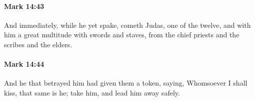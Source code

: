 		\paragraph{Mark 14:43} %
			\label{MARK-14-43}

			And immediately, while he yet spake, cometh Judas, one of the twelve, and with him a great multitude with swords and staves, from the chief priests and the scribes and the elders.

			\begin{framed}
			\scriptsize
				\begin{compactdesc}
					\item[SBLG] 
				\end{compactdesc}
			\end{framed}

		\paragraph{Mark 14:44} %
			\label{MARK-14-44}

			And he that betrayed him had given them a token, saying, Whomsoever I shall kiss, that same is he; take him, and lead him away safely.

